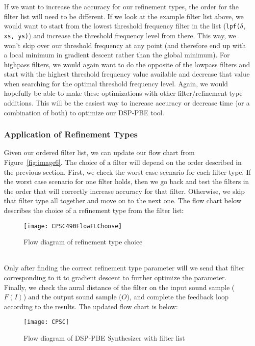\documentclass[english, 11pt]{article}
\begin{document}
If we want to increase the accuracy for our refinement types, the order for the filter list will need to be different. If we look at the example filter list above, we would want to start from the lowest threshold frequency filter in the list (\texttt{lpf($\delta$, xs, ys)}) and increase the threshold frequency level from there. This way, we won't skip over our threshold frequency at any point (and therefore end up with a local minimum in gradient descent rather than the global minimum). For highpass filters, we would again want to do the opposite of the lowpass filters and start with the highest threshold frequency value available and decrease that value when searching for the optimal threshold frequency level. Again, we would hopefully be able to make these optimizations with other filter/refinement type additions. This will be the easiest way to increase accuracy or decrease time (or a combination of both) to optimize our DSP-PBE tool.

\subsubsection{Application of Refinement Types}

Given our ordered filter list, we can update our flow chart from Figure~\ref{fig:image6}. The choice of a filter will depend on the order described in the previous section. First, we check the worst case scenario for each filter type. If the worst case scenario for one filter holds, then we go back and test the filters in the order that will correctly increase accuracy for that filter. Otherwise, we skip that filter type all together and move on to the next one. The flow chart below describes the choice of a refinement type from the filter list:
\begin{figure}[!htb]
\centerline{\texttt{[image: CPSC490FlowFLChoose]}}
\caption{Flow diagram of refinement type choice}\label{fig:image7}
\end{figure}\\ 
Only after finding the correct refinement type parameter will we send that filter corresponding to it to gradient descent to further optimize the parameter. Finally, we check the aural distance of the filter on the input sound sample ($F(I)$) and the output sound sample ($O$), and complete the feedback loop according to the results. The updated flow chart is below:
\begin{figure}[!htb]
\centerline{\texttt{[image: CPSC]}}
\caption{Flow diagram of DSP-PBE Synthesizer with filter list}\label{fig:image8}
\end{figure}
\end{document}
